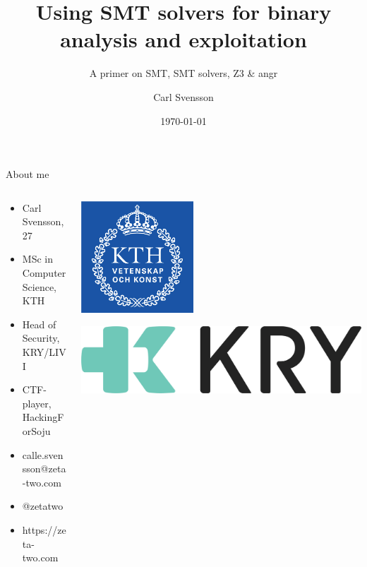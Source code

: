 \documentclass[10pt, compress, aspectratio=169]{beamer}
\title{Using SMT solvers for binary analysis and exploitation}
\subtitle{A primer on SMT, SMT solvers, Z3 \& angr}
\date{\today}
\author{Carl Svensson}
\institute{Nixucon 2018}
\begin{document}
\maketitle

\begin{frame}{About me}
  
	\begin{columns}
		\begin{column}{0.5\textwidth}  
  
  		\begin{itemize}
		  \item Carl Svensson, 27
		  \item MSc in Computer Science, KTH
		  \item Head of Security, KRY/LIVI
		  \item CTF-player, HackingForSoju
		  \item \faEnvelope \hskip 2mm calle.svensson@zeta-two.com
		  \item \faTwitter \hskip 2mm  @zetatwo
		  \item \faGlobe \hskip 2mm https://zeta-two.com
		\end{itemize}
		
		\end{column}
		\begin{column}{0.5\textwidth} 
			\begin{center}
			\includegraphics[width=0.4\textwidth]{images/kth.jpg}
			\end{center}
			\vspace{1cm}
			\includegraphics[width=\textwidth]{images/kry_logo.png}
		\end{column}
	\end{columns}
  
\end{frame}
\end{document}
